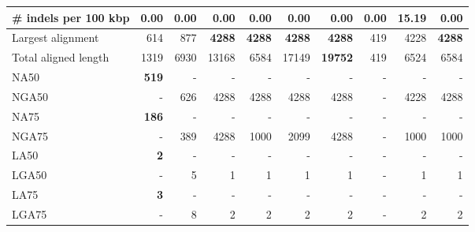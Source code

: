 \documentclass[12pt,a4paper]{article}
\begin{document}
\begin{table}[ht]
\begin{center}
\begin{tabular}{|l*{9}{|r}|}
\# indels per 100 kbp & {\bf 0.00} & {\bf 0.00} & {\bf 0.00} & {\bf 0.00} & {\bf 0.00} & {\bf 0.00} & {\bf 0.00} & 15.19 & {\bf 0.00} \\ \hline
Largest alignment & 614 & 877 & {\bf 4288} & {\bf 4288} & {\bf 4288} & {\bf 4288} & 419 & 4228 & {\bf 4288} \\ \hline
Total aligned length & 1319 & 6930 & 13168 & 6584 & 17149 & {\bf 19752} & 419 & 6524 & 6584 \\ \hline
NA50 & {\bf 519} & - & - & - & - & - & - & - & - \\ \hline
NGA50 & - & 626 & 4288 & 4288 & 4288 & 4288 & - & 4228 & 4288 \\ \hline
NA75 & {\bf 186} & - & - & - & - & - & - & - & - \\ \hline
NGA75 & - & 389 & 4288 & 1000 & 2099 & 4288 & - & 1000 & 1000 \\ \hline
LA50 & {\bf 2} & - & - & - & - & - & - & - & - \\ \hline
LGA50 & - & 5 & 1 & 1 & 1 & 1 & - & 1 & 1 \\ \hline
LA75 & {\bf 3} & - & - & - & - & - & - & - & - \\ \hline
LGA75 & - & 8 & 2 & 2 & 2 & 2 & - & 2 & 2 \\ \hline
\end{tabular}
\end{center}
\end{table}
\end{document}
